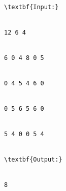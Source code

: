 \begin{verbatim}
\textbf{Input:}


12 6 4


6 0 4 8 0 5


0 4 5 4 6 0


0 5 6 5 6 0


5 4 0 0 5 4


\textbf{Output:}


8


\end{verbatim}